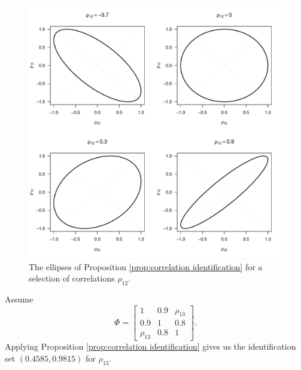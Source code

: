 \begin{figure}
\noindent \begin{centering}
\includegraphics[scale=0.4]{figures/rho}
\par\end{centering}
\caption{The ellipses of Proposition \ref{prop:correlation identification}
for a selection of correlations $\rho_{12}$.}
\end{figure}
%
\begin{example}
 Assume 
\[
\Phi=\left[\begin{array}{cc}
1 & 0.9 & \rho_{13}\\
0.9 & 1 & 0.8\\
\rho_{13} & 0.8 & 1
\end{array}\right].
\]
Applying Proposition \ref{prop:correlation identification} gives us
the identification set $(0.4585,0.9815)$ for $\rho_{13}$.
\end{example}



